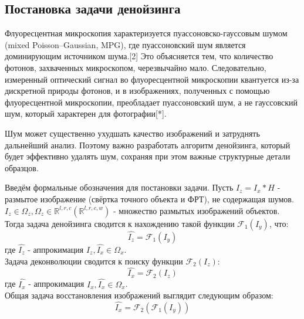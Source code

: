\subsection{Постановка задачи денойзинга}
\par Флуоресцентная микроскопия характеризуется пуассоновско-гауссовым шумом (mixed Poisson–Gaussian, MPG), где пуассоновский шум является доминирующим источником шума.[2] Это объясняется тем, что количество фотонов, захваченных микроскопом, черезвычайно мало. Следовательно, измеренный оптический сигнал во флуоресцентной микроскопии квантуется из-за дискретной природы фотонов, и в изображениях, полученных с помощью флуоресцентной микроскопии, преобладает пуассоновский шум, а не гауссовский шум, который характерен для фотографии[*]. 
\par Шум может существенно ухудшать качество изображений и затруднять дальнейший анализ. Поэтому важно разработать алгоритм денойзинга, который будет эффективно удалять шум, сохраняя при этом важные структурные детали образцов.
\par Введём формальные обозначения для постановки задачи. Пусть $I_z = I_x * H$ - размытое изображение (свёртка точного объекта и ФРТ), не содержащая шумов. $I_z \in \Omega_z, \Omega_z \in \mathbb{R}^{l,r,c} (\mathbb{R}^{l,r,c,w})$ - множество размытых изображений объектов. Тогда задача денойзинга сводится к нахождению такой функции $\mathscr{F}_1(I_y)$, что:
\begin{equation}
	\hat{I_z} = \mathscr{F}_1(I_y)
\end{equation}
где $\hat{I_z}$ - аппрокимация $I_z, \hat{I_x} \in \Omega_x$.\\
Задача деконволюции сводится к поиску функции $\mathscr{F}_2(I_z)$: 
\begin{equation}
	\hat{I_x} = \mathscr{F}_2(I_z)
\end{equation}
где $\hat{I_x}$ - аппрокимация $I_x, \hat{I_x} \in \Omega_x$.\\
Общая задача восстановления изображений выглядит следующим образом:
\begin{equation}
	\hat{I_x} = \mathscr{F}_2(\mathscr{F}_1(I_y))
\end{equation}

